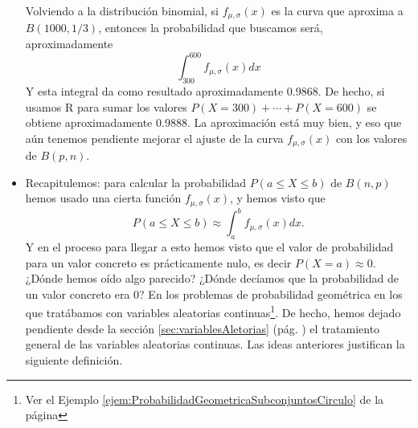 \begin{itemize}
        Volviendo a la distribución binomial, si $f_{\mu,\sigma}(x)$ es la curva que aproxima a $B(1000,1/3)$, entonces la probabilidad que buscamos será, aproximadamente
        \[\int_{300}^{600}f_{\mu,\sigma}(x)dx\]
        Y esta integral da como resultado aproximadamente $0.9868$. De hecho, si usamos R para sumar los valores $P(X=300)+\cdots+P(X=600)$ se obtiene aproximadamente $0.9888$. La aproximación está muy bien, y eso que aún tenemos pendiente mejorar el ajuste de la curva $f_{\mu,\sigma}(x)$ con los valores de $B(p,n)$.

    \item Recapitulemos: para calcular la probabilidad $P(a\leq X\leq b)$ de $B(n,p)$ hemos usado una cierta función $f_{\mu,\sigma}(x)$, y hemos visto que
        \[P(a\leq X\leq b)\approx \int_a^b f_{\mu,\sigma}(x)dx.\]
        Y en el proceso para llegar a esto hemos visto que el valor de probabilidad para un valor concreto es prácticamente nulo, es decir $P(X=a)\approx 0$. ¿Dónde hemos oído algo parecido? ¿Dónde decíamos que la probabilidad de un valor concreto era $0$? En los problemas de probabilidad geométrica en los que tratábamos con {\sf variables aleatorias continuas}\footnote{Ver el Ejemplo \ref{ejem:ProbabilidadGeometricaSubconjuntosCirculo} de la página \pageref{ejem:ProbabilidadGeometricaSubconjuntosCirculo}}.  De hecho, hemos dejado pendiente desde la sección \ref{sec:variablesAletorias} (pág. \pageref{sec:variablesAletorias}) el tratamiento general de las variables aleatorias continuas. Las ideas anteriores justifican la siguiente definición.\\[3mm]
\end{itemize}

